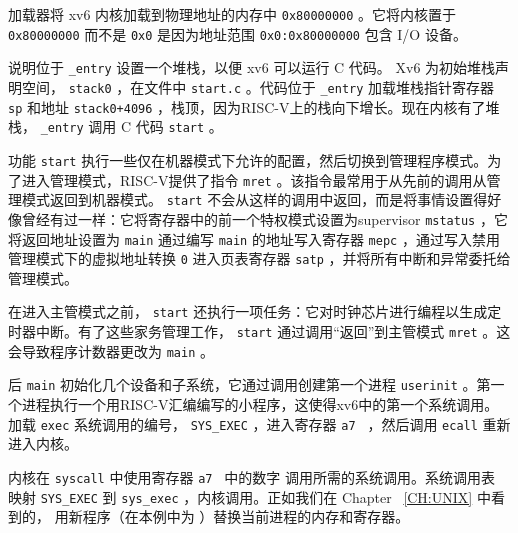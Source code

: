 \documentclass[UTF8]{article}
\begin{document}
加载器将 xv6 内核加载到物理地址的内存中
    \texttt{0x80000000}    。它将内核置于
    \texttt{0x80000000}    而不是
    \texttt{0x0}   是因为地址范围
    \texttt{0x0:0x80000000}    包含 I/O 设备。  

说明位于
    \lstinline{_entry}    设置一个堆栈，以便 xv6 可以运行 C 代码。 Xv6 为初始堆栈声明空间，
    \lstinline{stack0}   ，在文件中
    \lstinline{start.c}   
        。代码位于
    \lstinline{_entry}   加载堆栈指针寄存器
    \texttt{sp}    和地址
    \lstinline{stack0+4096}    ，栈顶，因为RISC-V上的栈向下增长。现在内核有了堆栈，
    \lstinline{_entry}    调用 C 代码
    \lstinline{start}   
        。  

功能
    \lstinline{start}    执行一些仅在机器模式下允许的配置，然后切换到管理程序模式。为了进入管理模式，RISC-V提供了指令
    \lstinline{mret}    。该指令最常用于从先前的调用从管理模式返回到机器模式。
    \lstinline{start}    不会从这样的调用中返回，而是将事情设置得好像曾经有过一样：它将寄存器中的前一个特权模式设置为supervisor
    \lstinline{mstatus}    ，它将返回地址设置为
    \lstinline{main}    通过编写
    \lstinline{main}    的地址写入寄存器
    \lstinline{mepc}    ，通过写入禁用管理模式下的虚拟地址转换
    \lstinline{0}    进入页表寄存器
    \lstinline{satp}    ，并将所有中断和异常委托给管理模式。  

在进入主管模式之前，
    \lstinline{start}    还执行一项任务：它对时钟芯片进行编程以生成定时器中断。有了这些家务管理工作，
    \lstinline{start}    通过调用“返回”到主管模式
    \lstinline{mret}    。这会导致程序计数器更改为
    \lstinline{main}   
        。  

后
    \lstinline{main}   
        初始化几个设备和子系统，它通过调用创建第一个进程
    \lstinline{userinit}   
        。第一个进程执行一个用RISC-V汇编编写的小程序，这使得xv6中的第一个系统调用。
        加载    \lstinline{exec}    系统调用的编号，   \lstinline{SYS_EXEC}   
       ，进入寄存器 {    \tt    a7   } ，然后调用   \lstinline{ecall}   重新进入内核。  

内核在   \lstinline{syscall}   中使用寄存器 {    \tt    a7   } 中的数字
        调用所需的系统调用。系统调用表      映射
    \lstinline{SYS_EXEC}    到    \lstinline{sys_exec}    ，内核调用。正如我们在 Chapter~    \ref{CH:UNIX}    中看到的，        用新程序（在本例中为        ）替换当前进程的内存和寄存器。  
\end{document}
